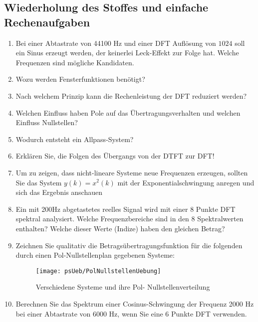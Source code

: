 \subsection{Wiederholung des Stoffes und einfache Rechenaufgaben}
\begin{enumerate}
    \item Bei einer Abtastrate von 44100 Hz und einer DFT Auflösung von $1024$ soll
    ein Sinus erzeugt werden, der keinerlei Leck-Effekt zur Folge hat. Welche Frequenzen sind
    mögliche Kandidaten.
    \item Wozu werden Fensterfunktionen benötigt?
    \item Nach welchem Prinzip kann die Rechenleistung der DFT reduziert werden?
    \item Welchen Einfluss haben Pole auf das Übertragungsverhalten und welchen Einfluss Nullstellen?
    \item Wodurch entsteht ein Allpass-System?
    \item Erklären Sie, die Folgen des Übergangs von der DTFT zur DFT!
    \item Um zu zeigen, dass nicht-lineare Systeme neue Frequenzen
    erzeugen, sollten Sie das System $y(k) = x^2(k)$ mit der
    Exponentialschwingung anregen und sich das Ergebnis anschauen
    \item Ein mit 200Hz abgetastetes reelles Signal wird mit einer 8 Punkte
    DFT spektral analysiert. Welche Frequenzbereiche sind in den 8
    Spektralwerten enthalten? Welche dieser Werte (Indize) haben den gleichen
    Betrag?
    \item {Zeichnen Sie qualitativ die Betragsübertragungsfunktion für die folgenden durch
    einen Pol-Nullstellenplan gegebenen Systeme:
   \begin{figure}[H]
    \begin{center}
    \texttt{[image: psUeb/PolNullstellenUebung]}
    \caption{\label{pic:SpektrenPolNullstellenplan} Verschiedene Systeme und ihre Pol- Nullstellenverteilung}
    \end{center}
    \end{figure}
    }
    \item Berechnen Sie das Spektrum einer Cosinus-Schwingung der Frequenz 2000 Hz bei einer
    Abtastrate von 6000 Hz, wenn Sie eine 6 Punkte DFT verwenden.
\end{enumerate}

